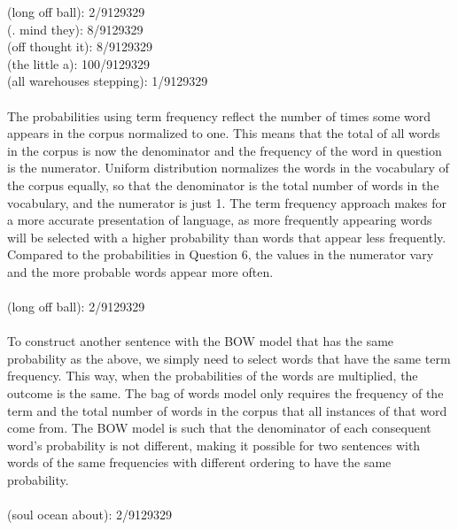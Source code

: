 \documentclass[10pt]{article}
\begin{document}
(long off ball): 2/9129329 \\
(. mind they): 8/9129329 \\
(off thought it): 8/9129329 \\
(the little a): 100/9129329 \\
(all warehouses stepping): 1/9129329
\\
\\
The probabilities using term frequency reflect the number of times some word appears in the corpus normalized to one. This means that the total of all words in the corpus is now the denominator and the frequency of the word in question is the numerator. Uniform distribution normalizes the words in the vocabulary of the corpus equally, so that the denominator is the total number of words in the vocabulary, and the numerator is just 1. The term frequency approach makes for a more accurate presentation of language, as more frequently appearing words will be selected with a higher probability than words that appear less frequently. Compared to the probabilities in Question 6, the values in the numerator vary and the more probable words appear more often. \\
\\
(long off ball): 2/9129329 \\
\\
To construct another sentence with the BOW model that has the same probability as the above, we simply need to select words that have the same term frequency. This way, when the probabilities of the words are multiplied, the outcome is the same. The bag of words model only requires the frequency of the term and the total number of words in the corpus that all instances of that word come from. The BOW model is such that the denominator of each consequent word's probability is not different, making it possible for two sentences with words of the same frequencies with different ordering to have the same probability.  \\
\\
(soul ocean about): 2/9129329
\end{document}
